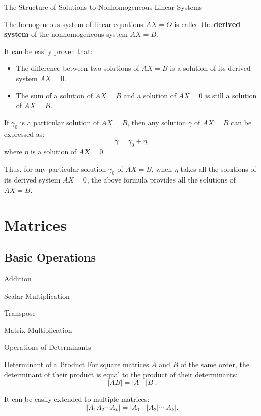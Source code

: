 \documentclass[11pt]{../../TexTemplate/elegantbook} %
\begin{document}
\begin{leftbarTitle}{The Structure of Solutions to Nonhomogeneous Linear Systems}\end{leftbarTitle}
The homogeneous system of linear equations \( AX = O \) is called the \textbf{derived system} of 
the nonhomogeneous system \( AX = B \).

It can be easily proven that:
\begin{itemize}
    \item The difference between two solutions of \( AX = B \) is a solution of its derived system \( AX = 0 \).
    \item The sum of a solution of \( AX = B \) and a solution of \( AX = 0 \) is still a solution of \( AX = B \).
\end{itemize}

\vspace{0.7cm}
If \( \gamma_{0} \) is a particular solution of \( AX = B \), 
then any solution \( \gamma \) of \( AX = B \) can be expressed as:
\[
\gamma = \gamma_{0} + \eta,
\]
where \( \eta \) is a solution of \( AX = 0 \).

Thus, for any particular solution \( \gamma_{0} \) of \( AX = B \), 
when \( \eta \) takes all the solutions of its derived system \( AX = 0 \), 
the above formula provides all the solutions of \( AX = B \).

\chapter{Matrices}
\section{Basic Operations}
\begin{leftbarTitle}{Addition}\end{leftbarTitle}
\begin{leftbarTitle}{Scalar Multiplication}\end{leftbarTitle}
\begin{leftbarTitle}{Transpose}\end{leftbarTitle}
\begin{leftbarTitle}{Matrix Multiplication}\end{leftbarTitle}



\begin{leftbarTitle}{Operations of Determinants}\end{leftbarTitle}
\begin{theorem}{Determinant of a Product}
    For square matrices \( A \) and \( B \) of the same order, 
    the determinant of their product is equal to the product of their determinants:
    \[
    |AB| = |A| \cdot |B|.
    \]

    It can be easily extended to multiple matrices:
    \[
    |A_1 A_2 \cdots A_k| = |A_1| \cdot |A_2| \cdots |A_k|.
    \]
\end{theorem}
\end{document}
